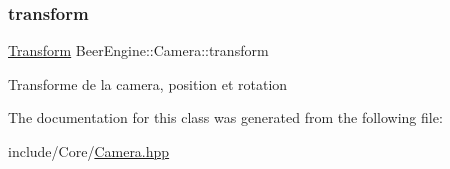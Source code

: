 \subsubsection{\texorpdfstring{transform}{transform}}
{\footnotesize\ttfamily \mbox{\hyperlink{class_beer_engine_1_1_transform}{Transform}} Beer\+Engine\+::\+Camera\+::transform}

Transforme de la camera, position et rotation 

The documentation for this class was generated from the following file\+:\begin{DoxyCompactItemize}
\item 
include/\+Core/\mbox{\hyperlink{_camera_8hpp}{Camera.\+hpp}}\end{DoxyCompactItemize}
